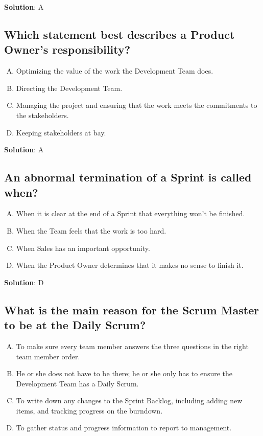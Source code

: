 \textbf{Solution}: A


\subsection{Which statement best describes a Product Owner's responsibility?}
\begin{enumerate}[A)]
  \item Optimizing the value of the work the Development Team does.
  \item Directing the Development Team.
  \item Managing the project and ensuring that the work meets the commitments to the stakeholders.
  \item Keeping stakeholders at bay.
\end{enumerate}


\textbf{Solution}: A


\subsection{An abnormal termination of a Sprint is called when?}
\begin{enumerate}[A)]
  \item When it is clear at the end of a Sprint that everything won't be finished.
  \item When the Team feels that the work is too hard.
  \item When Sales has an important opportunity.
  \item When the Product Owner determines that it makes no sense to finish it.
\end{enumerate}


\textbf{Solution}: D


\subsection{What is the main reason for the Scrum Master to be at the Daily Scrum?}
\begin{enumerate}[A)]
  \item To make sure every team member answers the three questions in the right team member order.
  \item He or she does not have to be there; he or she only has to ensure the Development Team has a Daily Scrum.
  \item To write down any changes to the Sprint Backlog, including adding new items, and tracking progress on the burndown.
  \item To gather status and progress information to report to management.
\end{enumerate}


